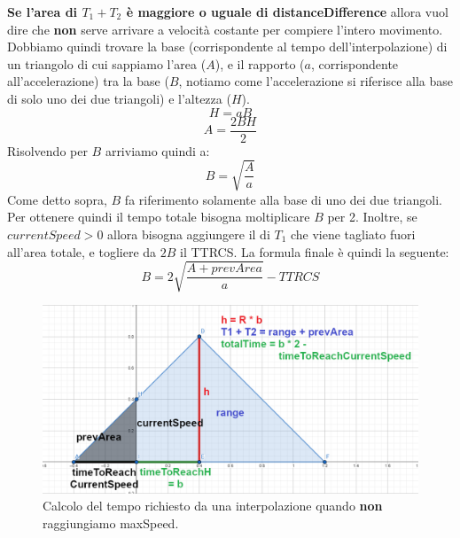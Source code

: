 \documentclass[main.tex]{subfiles}
\begin{document}
\textbf{Se l'area di $T_1 + T_2$ è maggiore o uguale di distanceDifference} allora vuol dire che \textbf{non} serve arrivare a velocità costante per compiere l'intero movimento. Dobbiamo quindi trovare la base (corrispondente al tempo dell'interpolazione) di un triangolo di cui sappiamo l'area ($A$), e il rapporto ($a$, corrispondente all'accelerazione) tra la base ($B$, notiamo come l'accelerazione si riferisce alla base di solo uno dei due triangoli) e l'altezza ($H$).
\[H = aB\]
\[A = \frac{2BH}{2}\]
Risolvendo per $B$ arriviamo quindi a:
\[B = \sqrt{\frac{A}{a}}\]
Come detto sopra, $B$ fa riferimento solamente alla base di uno dei due triangoli. Per ottenere quindi il tempo totale bisogna moltiplicare $B$ per 2. Inoltre, se $currentSpeed > 0$ allora bisogna aggiungere il  di $T_1$ che viene tagliato fuori all'area totale, e togliere da $2B$ il TTRCS. La formula finale è quindi la seguente:
\[B = 2\sqrt{\frac{A + prevArea}{a}} - TTRCS\]
\begin{figure}[H]
    \centering
    \includegraphics[width=1\linewidth]{img/interpolazione/speedCapNoMaxSpeedCalcSplice.png}
    \caption{Calcolo del tempo richiesto da una interpolazione quando \textbf{non} raggiungiamo maxSpeed.}
    \label{fig:4_speedCapNoMaxSpeedCalcSplice}
\end{figure}
\end{document}
